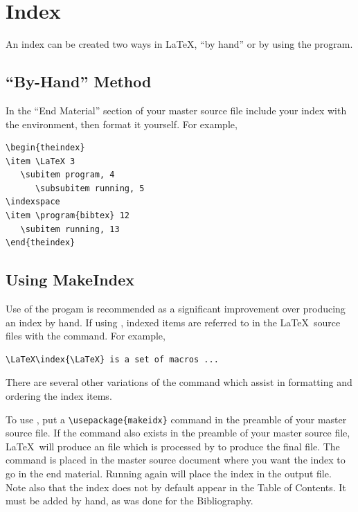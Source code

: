 \section{Index}
An index can be created two ways in \LaTeX , ``by hand'' or by using the  program.
\subsection{``By-Hand'' Method}
In the ``End Material'' section of your master source file include your index with the  environment, then format it yourself.
For example,
\begin{verbatim}
\begin{theindex}
\item \LaTeX 3
   \subitem program, 4
      \subsubitem running, 5
\indexspace
\item \program{bibtex} 12
   \subitem running, 13
\end{theindex}
\end{verbatim}
\subsection{Using MakeIndex}
Use of the  progam is recommended as a significant improvement over producing an index by hand.
If using , indexed items are
referred to in the \LaTeX\ source files with the  command.
For example,
\begin{verbatim}
\LaTeX\index{\LaTeX} is a set of macros ...
\end{verbatim}
There are several other variations of the  command which assist in formatting and ordering the index items.

To use , put a \verb=\usepackage{makeidx}= command in the preamble of your master source file.
If the command  also exists in the preamble of your master source file, \LaTeX\ will produce an  file which is processed by  to produce the final  file.
The  command is placed in the master source document where you want the index to go in the end material.
Running  again will place the index in the output  file.
Note also that the index does not by default appear in the Table of Contents.
It must be added by hand, as was done for the Bibliography.
